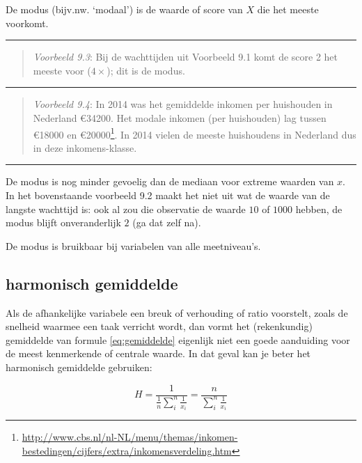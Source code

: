 \documentclass[
]{book}
\begin{document}
De modus (bijv.nw. `modaal') is de waarde of score van \(X\) die het
meeste voorkomt.

\begin{center}\rule{0.5\linewidth}{0.5pt}\end{center}

\begin{quote}
\emph{Voorbeeld 9.3}: Bij de wachttijden uit Voorbeeld 9.1
komt de score 2 het meeste voor
(\(4\times\)); dit is de modus.
\end{quote}

\begin{center}\rule{0.5\linewidth}{0.5pt}\end{center}

\begin{quote}
\emph{Voorbeeld 9.4}: In 2014 was het gemiddelde inkomen per huishouden in Nederland €34200.
Het modale inkomen (per huishouden) lag tussen €18000 en €20000\footnote{\url{http://www.cbs.nl/nl-NL/menu/themas/inkomen-bestedingen/cijfers/extra/inkomensverdeling.htm}}. In
2014 vielen de meeste huishoudens in Nederland dus in deze inkomens-klasse.
\end{quote}

\begin{center}\rule{0.5\linewidth}{0.5pt}\end{center}

De modus is nog minder gevoelig dan de mediaan voor extreme waarden van
\(x\). In het bovenstaande voorbeeld 9.2 maakt het niet uit wat de waarde
van de langste wachttijd is: ook al zou die observatie de waarde \(10\) of
\(1000\) hebben, de modus blijft onveranderlijk \(2\) (ga dat zelf na).

De modus is bruikbaar bij variabelen van alle meetniveau's.

\hypertarget{sec:harmonischgemiddelde}{%
\subsection{harmonisch gemiddelde}\label{sec:harmonischgemiddelde}}

Als de afhankelijke variabele een breuk of verhouding of ratio
voorstelt, zoals de snelheid waarmee een taak verricht wordt, dan vormt
het (rekenkundig) gemiddelde van formule \eqref{eq:gemiddelde}
eigenlijk niet een goede aanduiding voor de
meest kenmerkende of centrale waarde. In dat geval kan je beter het
harmonisch gemiddelde gebruiken:

\begin{equation}
  H = \frac{1}{\frac{1}{n} \sum\limits_{i}^n \frac{1}{x_i} } = \frac{n}{\sum\limits_{i}^n \frac{1}{x_i}}
  \label{eq:harmonischgemiddelde}
\end{equation}
\end{document}
